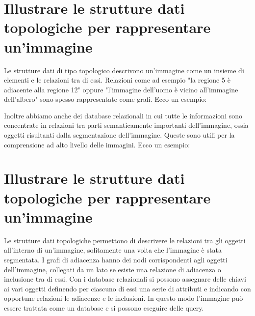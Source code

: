 \section{Illustrare le strutture dati topologiche per rappresentare un'immagine}
Le strutture dati di tipo topologico descrivono un'immagine come un insieme di elementi e le relazioni tra di essi. Relazioni come ad esempio "la regione 5 è adiacente alla regione 12" oppure "l'immagine dell'uomo è vicino all'immagine dell'albero" sono spesso rappresentate come grafi.
Ecco un esempio:

Inoltre abbiamo anche dei database relazionali in cui tutte le informazioni sono concentrate in relazioni tra parti semanticamente importanti dell'immagine, ossia oggetti risultanti dalla segmentazione dell'immagine. Queste sono utili per la comprensione ad alto livello delle immagini.
Ecco un esempio:

\section{Illustrare le strutture dati topologiche per rappresentare un'immagine}
Le strutture dati topologiche permettono di descrivere le relazioni tra gli oggetti all'interno di un'immagine, solitamente una volta che l'immagine è stata segmentata. I grafi di adiacenza hanno dei nodi corrispondenti agli oggetti dell'immagine, collegati da un lato se esiste una relazione di adiacenza o inclusione tra di essi. Con i database relazionali si possono assegnare delle chiavi ai vari oggetti definendo per ciascuno di essi una serie di attributi e indicando con opportune relazioni le adiacenze e le inclusioni. In questo modo l'immagine può essere trattata come un database e si possono eseguire delle query.

